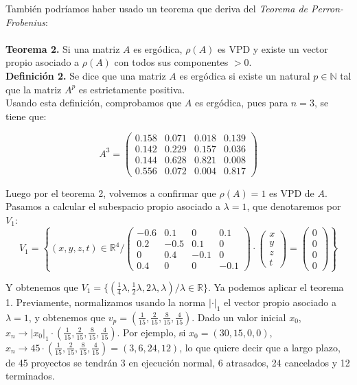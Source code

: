 \documentclass[10pt,a4paper]{article}
\begin{document}
También podríamos haber usado un teorema que deriva del \textit{Teorema de Perron-Frobenius}:\\
\\
\textbf{Teorema 2.} Si una matriz $A$ es ergódica, $\rho(A)$ es VPD y existe un vector propio asociado a \(\rho (A)\) con todos sus componentes \(> 0\).\\
\textbf{Definición 2.} Se dice que una matriz $A$ es ergódica si existe un natural $p \in \mathbb{N}$ tal que la matriz $A^p$ es estrictamente positiva.\\

Usando esta definición, comprobamos que $A$ es ergódica, pues para $n = 3$, se tiene que:

\[
A^3 =
\begin{pmatrix}
0.158 & 0.071 & 0.018 & 0.139 \\
0.142 & 0.229 & 0.157 & 0.036 \\
0.144 & 0.628 & 0.821 & 0.008 \\
0.556 & 0.072 & 0.004 & 0.817 
\end{pmatrix}
\]

Luego por el teorema 2, volvemos a confirmar que $\rho(A) = 1$ es VPD de $A$. Pasamos a calcular el subespacio propio asociado a $\lambda = 1$, que denotaremos por $V_1$:
\\
\[
V_1 = \left\{(x,y,z,t) \in \mathbb{R}^4 / 
\begin{pmatrix}
-0.6 & 0.1 & 0 & 0.1 \\
0.2 & -0.5 & 0.1 & 0 \\
0 & 0.4 & -0.1 & 0 \\
0.4 & 0 & 0 & -0.1 
\end{pmatrix} \cdot
\begin{pmatrix}
x \\
y \\
z \\
t 
\end{pmatrix} =
\begin{pmatrix}
0 \\
0 \\
0 \\
0 
\end{pmatrix} \right\}
\]

Y obtenemos que $V_1 = \{(\frac{1}{4}\lambda, \frac{1}{2}\lambda, 2\lambda, \lambda) / \lambda \in \mathbb{R}\}$. Ya podemos aplicar el teorema 1. Previamente, normalizamos usando la norma $|\cdot|_1$ el vector propio asociado a $\lambda = 1$, y obtenemos que $v_p = (\frac{1}{15},\frac{2}{15}, \frac{8}{15}, \frac{4}{15})$. Dado un valor inicial $x_0$, $x_n \rightarrow |x_0|_1 \cdot (\frac{1}{15},\frac{2}{15}, \frac{8}{15}, \frac{4}{15})$. Por ejemplo, si $x_0 = (30,15,0,0)$, $x_n \rightarrow 45 \cdot (\frac{1}{15},\frac{2}{15}, \frac{8}{15}, \frac{4}{15}) = (3,6,24,12)$, lo que quiere decir que a largo plazo, de 45 proyectos se tendrán 3 en ejecución normal, 6 atrasados, 24 cancelados y 12 terminados.
\end{document}
